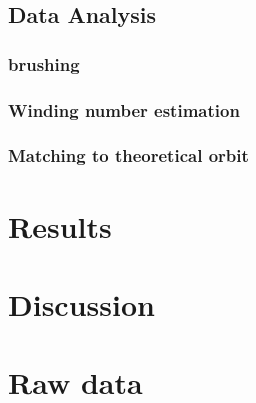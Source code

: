 \documentclass[]{report}
\begin{document}
\section{Data Analysis}


\subsection{brushing}


\subsection{Winding number estimation}


\subsection{Matching to theoretical orbit}


\chapter{Results}


\chapter{Discussion}

\appendix
\chapter{Raw data}

%
%
%
%
%


\end{document}
